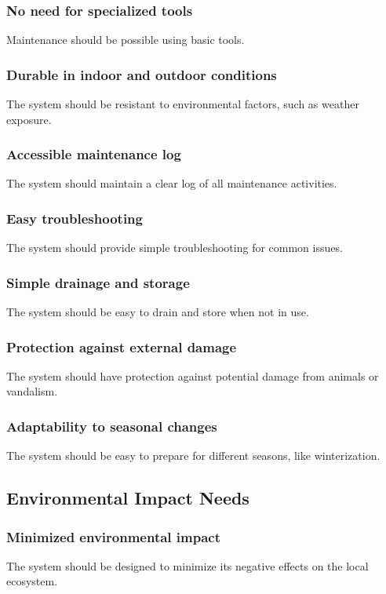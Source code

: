 \documentclass[12pt]{report}
\begin{document}
\subsubsection{No need for specialized tools}
Maintenance should be possible using basic tools.

\subsubsection{Durable in indoor and outdoor conditions}
The system should be resistant to environmental factors, such as weather exposure.

\subsubsection{Accessible maintenance log}
The system should maintain a clear log of all maintenance activities.

\subsubsection{Easy troubleshooting}
The system should provide simple troubleshooting for common issues.

\subsubsection{Simple drainage and storage}
The system should be easy to drain and store when not in use.

\subsubsection{Protection against external damage}
The system should have protection against potential damage from animals or vandalism.

\subsubsection{Adaptability to seasonal changes}
The system should be easy to prepare for different seasons, like winterization.

\newpage
\subsection{Environmental Impact Needs}

\subsubsection{Minimized environmental impact}
The system should be designed to minimize its negative effects on the local ecosystem.
\end{document}
